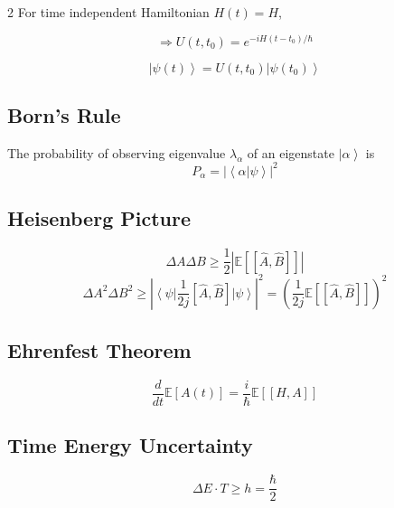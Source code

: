 \documentclass[
]{article}
\providecommand{\ket}[1]{\left\lvert #1 \right\rangle}
\providecommand{\bra}[1]{\left\langle #1 \right\rvert}
\providecommand{\braket}[1]{\left\langle #1 \right\rangle}
\providecommand{\Rarr}{\Rightarrow}
\begin{document}
\begin{multicols}{2}
	For time independent Hamiltonian $H(t)=H$,

	\[
		\Rarr U(t,t_0) = e^{-iH(t-t_0)/\hbar}
	\]

	\[
		\ket{\psi(t)}=U(t,t_0)\ket{\psi(t_0)}
	\]
	\subsection*{Born's Rule}

	The probability of observing eigenvalue $\lambda_\alpha$ of an eigenstate $\ket{\alpha}$ is
	\[
		P_\alpha=|\braket{\alpha|\psi}|^2
	\]

	\subsection*{Heisenberg Picture}
	\[
		\Delta A\Delta B\geq \frac{1}{2}\left|\mathbb{E}\left[[\hat{A},\hat{B}]\right]\right|
	\]
	\[
		\Delta A^2 \Delta B^2 \geq \left|\bra{\psi}\frac{1}{2j}[\hat{A},\hat{B}]\ket{\psi}\right|^2 = \left(\frac{1}{2j}\mathbb{E}\left[[\hat{A},\hat{B}]\right]\right)^2
	\]

	\subsection*{Ehrenfest Theorem}
	\[
		\frac{d}{dt}\mathbb{E}[A(t)]=\frac{i}{\hbar}\mathbb{E}\left[[H,A]\right]
	\]

	\subsection*{Time Energy Uncertainty}
	\[
		\Delta E \cdot T\geq h = \frac{\hbar}{2}
	\]

\end{multicols}
\end{document}
